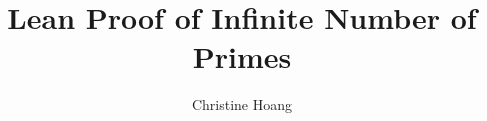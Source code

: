 \documentclass{article}
\title{Lean Proof of Infinite Number of Primes}
\author{Christine Hoang}
\begin{document}
\maketitle

\section{}
\end{document}
